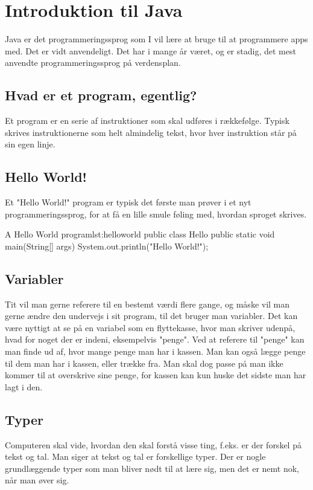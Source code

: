 \chapter{Introduktion til Java}
Java er det programmeringssprog som I vil lære at bruge til at programmere apps med. Det er vidt anvendeligt. Det har i mange år været, og er stadig, det mest anvendte programmeringssprog på verdensplan.

\section{Hvad er et program, egentlig?}
Et program er en serie af instruktioner som skal udføres i rækkefølge. Typisk skrives instruktionerne som helt almindelig tekst, hvor hver instruktion står på sin egen linje.

\section{Hello World!}
Et "Hello World!" program er typisk det første man prøver i et nyt programmeringssprog, for at få en lille smule føling med, hvordan sproget skrives.

\begin{JavaCode}{A Hello World program}{lst:helloworld}
	public class Hello {
		public static void main(String[] args) {
			System.out.println("Hello World!");
		}
	}
\end{JavaCode}


\section{Variabler}
Tit vil man gerne referere til en bestemt værdi flere gange, og måske vil man gerne ændre den undervejs i sit program, til det bruger man variabler. Det kan være nyttigt at se på en variabel som en flyttekasse, hvor man skriver udenpå, hvad for noget der er indeni, eksempelvis "penge". Ved at referere til "penge" kan man finde ud af, hvor mange penge man har i kassen. Man kan også lægge penge til dem man har i kassen, eller trække fra. Man skal dog passe på man ikke kommer til at overskrive sine penge, for kassen kan kun huske det sidste man har lagt i den.

\section{Typer}
Computeren skal vide, hvordan den skal forstå visse ting, f.eks. er der forskel på tekst og tal. Man siger at tekst og tal er forskellige typer. Der er nogle grundlæggende typer som man bliver nødt til at lære sig, men det er nemt nok, når man øver sig.

